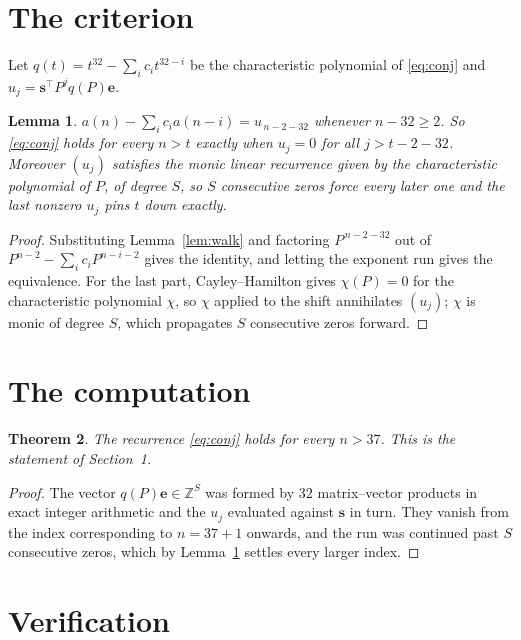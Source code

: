\documentclass[11pt,a4paper]{article}
\theoremstyle{plain}
\newtheorem{theorem}{Theorem}
\newtheorem{lemma}[theorem]{Lemma}
\theoremstyle{definition}
\begin{document}
\section{The criterion}

Let $q(t)=t^{32}-\sum_i c_i t^{32-i}$ be the characteristic polynomial of
\eqref{eq:conj} and $u_j=\mathbf{s}^{\!\top}P^{j}q(P)\mathbf{e}$.

\begin{lemma}\label{lem:crit}
$a(n)-\sum_i c_i a(n-i)=u_{\,n-2-32}$ whenever $n-32\ge2$. So \eqref{eq:conj}
holds for every $n>t$ exactly when $u_j=0$ for all $j>t-2-32$. Moreover $(u_j)$
satisfies the monic linear recurrence given by the characteristic polynomial of $P$, of
degree $S$, so $S$ consecutive zeros force every later one and the last nonzero $u_j$ pins
$t$ down exactly.
\end{lemma}

\begin{proof}
Substituting Lemma~\ref{lem:walk} and factoring $P^{\,n-2-32}$ out of
$P^{n-2}-\sum_i c_i P^{n-i-2}$ gives the identity, and letting the exponent run gives the
equivalence. For the last part, Cayley--Hamilton gives $\chi(P)=0$ for the characteristic
polynomial $\chi$, so $\chi$ applied to the shift annihilates $(u_j)$; $\chi$ is monic of
degree $S$, which propagates $S$ consecutive zeros forward.
\end{proof}

\section{The computation}

\begin{theorem}
The recurrence \eqref{eq:conj} holds for every $n>37$. This is the statement of
Section~1.
\end{theorem}

\begin{proof}
The vector $q(P)\mathbf{e}\in\mathbb{Z}^{S}$ was formed by $32$ matrix--vector
products in exact integer arithmetic and the $u_j$ evaluated against $\mathbf{s}$ in turn.
They vanish from the index corresponding to $n=37+1$ onwards, and the run was continued
past $S$ consecutive zeros, which by Lemma~\ref{lem:crit} settles every larger index.
\end{proof}

\section{Verification}
\end{document}
